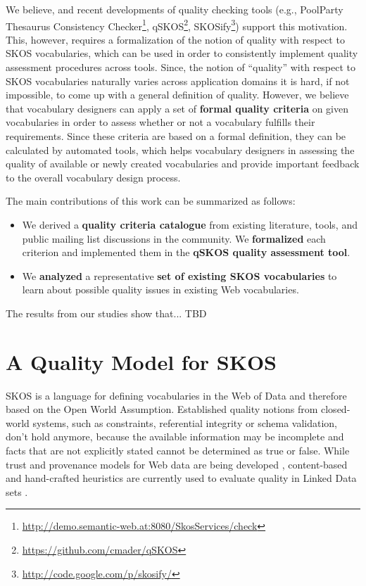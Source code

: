 \documentclass{llncs}
\begin{document}
We believe, and recent developments of quality checking tools (e.g., PoolParty Thesaurus Consistency Checker\footnote{\url{http://demo.semantic-web.at:8080/SkosServices/check}}, qSKOS\footnote{\url{https://github.com/cmader/qSKOS}}, SKOSify\footnote{\url{http://code.google.com/p/skosify/}}) support this motivation. This, however, requires a formalization of the notion of quality with respect to SKOS vocabularies, which can be used in order to consistently implement quality assessment procedures across tools. Since, the notion of “quality” with respect to SKOS vocabularies naturally varies across application domains it is hard, if not impossible, to come up with a general definition of quality. However, we believe that vocabulary designers can apply a set of \textbf{formal quality criteria} on given vocabularies in order to assess whether or not a vocabulary fulfills their requirements. Since these criteria are based on a formal definition, they can be calculated by automated tools, which helps vocabulary designers in assessing the quality of available or newly created vocabularies and provide important feedback to the overall vocabulary design process.

The main contributions of this work can be summarized as follows:
\begin{itemize}
	\item We derived a \textbf{quality criteria catalogue} from existing literature, tools, and public mailing list discussions in the community. We \textbf{formalized} each criterion and implemented them in the \textbf{qSKOS quality assessment tool}.

	\item We \textbf{analyzed} a representative \textbf{set of existing SKOS vocabularies} to learn about possible quality issues in existing Web vocabularies.
\end{itemize}

The results from our studies show that... TBD

\section{A Quality Model for SKOS}
SKOS is a language for defining vocabularies in the Web of Data and therefore based on the Open World Assumption. Established quality notions from closed-world systems, such as constraints, referential integrity or schema validation, don’t hold anymore, because the available information may be incomplete and facts that are not explicitly stated cannot be determined as true or false. While trust and provenance models for Web data are being developed \cite{Omitola2011,Hartig2009}, content-based and hand-crafted heuristics are currently used to evaluate quality in Linked Data sets \cite{Heath2011}.
\end{document}
